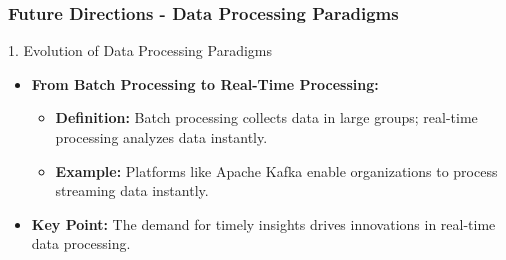 \documentclass[aspectratio=169]{beamer}
\begin{document}
\begin{frame}[fragile]
    \frametitle{Future Directions - Data Processing Paradigms}
    \begin{block}{1. Evolution of Data Processing Paradigms}
        \begin{itemize}
            \item \textbf{From Batch Processing to Real-Time Processing:}
                \begin{itemize}
                    \item \textbf{Definition:} Batch processing collects data in large groups; real-time processing analyzes data instantly.
                    \item \textbf{Example:} Platforms like Apache Kafka enable organizations to process streaming data instantly.
                \end{itemize}
            \item \textbf{Key Point:} The demand for timely insights drives innovations in real-time data processing.
        \end{itemize}
    \end{block}
\end{frame}
\end{document}

